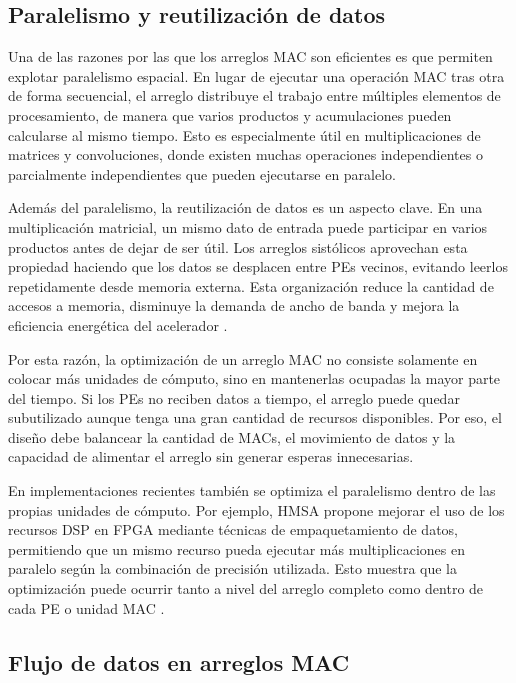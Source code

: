 \documentclass[conference]{IEEEtran}
\begin{document}
\subsection{Paralelismo y reutilización de datos}

Una de las razones por las que los arreglos MAC son eficientes es que permiten explotar paralelismo espacial. En lugar de ejecutar una operación MAC tras otra de forma secuencial, el arreglo distribuye el trabajo entre múltiples elementos de procesamiento, de manera que varios productos y acumulaciones pueden calcularse al mismo tiempo. Esto es especialmente útil en multiplicaciones de matrices y convoluciones, donde existen muchas operaciones independientes o parcialmente independientes que pueden ejecutarse en paralelo.

Además del paralelismo, la reutilización de datos es un aspecto clave. En una multiplicación matricial, un mismo dato de entrada puede participar en varios productos antes de dejar de ser útil. Los arreglos sistólicos aprovechan esta propiedad haciendo que los datos se desplacen entre PEs vecinos, evitando leerlos repetidamente desde memoria externa. Esta organización reduce la cantidad de accesos a memoria, disminuye la demanda de ancho de banda y mejora la eficiencia energética del acelerador \cite{xu2023survey}.

Por esta razón, la optimización de un arreglo MAC no consiste solamente en colocar más unidades de cómputo, sino en mantenerlas ocupadas la mayor parte del tiempo. Si los PEs no reciben datos a tiempo, el arreglo puede quedar subutilizado aunque tenga una gran cantidad de recursos disponibles. Por eso, el diseño debe balancear la cantidad de MACs, el movimiento de datos y la capacidad de alimentar el arreglo sin generar esperas innecesarias.

En implementaciones recientes también se optimiza el paralelismo dentro de las propias unidades de cómputo. Por ejemplo, HMSA propone mejorar el uso de los recursos DSP en FPGA mediante técnicas de empaquetamiento de datos, permitiendo que un mismo recurso pueda ejecutar más multiplicaciones en paralelo según la combinación de precisión utilizada. Esto muestra que la optimización puede ocurrir tanto a nivel del arreglo completo como dentro de cada PE o unidad MAC \cite{cao2025hmsa}.

\subsection{Flujo de datos en arreglos MAC}
\end{document}

